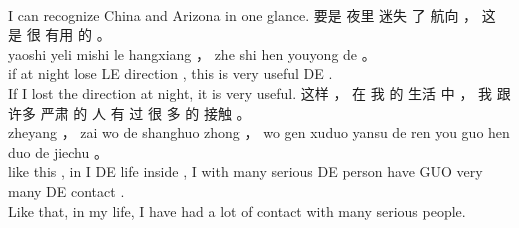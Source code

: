 \documentclass[UTF8]{ctexart}
\begin{document}
\begin{exe}
\\
\trans I can recognize China and Arizona in one glance.
\ex
\glll
要是 夜里 迷失 了 航向 ， 这 是 很 有用 的 。
\\
yaoshi yeli mishi le hangxiang ， zhe shi hen youyong de 。
\\
if {at night} lose LE direction , this is very useful DE .
\\
\trans If I lost the direction at night, it is very useful. 
\ex
\glll
这样 ， 在 我 的 生活 中 ， 我 跟 许多 严肃 的 人 有 过 很 多 的 接触 。
\\
zheyang  ， zai wo de shanghuo zhong ， wo gen xuduo yansu de ren you guo hen duo de jiechu 。
\\
{like this} , in I DE life inside , I with many serious DE person have GUO very many DE contact .
\\
\trans Like that, in my life, I have had a lot of contact with many serious people. 
\end{exe}
\end{document}
